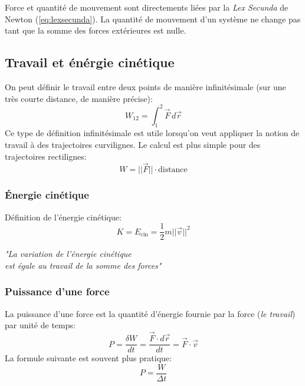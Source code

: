 \documentclass{article}
\numberwithin{equation}{section}
\begin{document}
Force et quantité de mouvement sont directements liées par la \emph{Lex Secunda} de Newton (\ref{eq:lexsecunda}). La quantité de mouvement d'un système ne change pas tant que la somme des forces extérieures est nulle.

\subsection{Travail et énérgie cinétique}

On peut définir le travail entre deux points de manière infinitésimale (sur une très courte distance, de manière précise):
\begin{equation}
	\boxed{ W_{12} = \int_1^2 \vec F \, d \vec r }
\end{equation}
Ce type de définition infinitésimale est utile lorsqu'on veut appliquer la notion de travail à des trajectoires curvilignes. Le calcul est plus simple pour des trajectoires rectilignes:
\begin{equation}
	\boxed{ W = ||\vec F|| \cdot \text{distance} }
\end{equation}

\subsubsection{Énergie cinétique}
Définition de l'énergie cinétique:
\begin{equation}
	\boxed{ K = E_\text{cin} = \frac{1}{2} m ||\vec v||^2 }
\end{equation}

\begin{center}
	\emph{"La variation de l'énergie cinétique \\ est égale au travail de la somme des forces"}
\end{center}


\subsubsection{Puissance d'une force}
La puissance d'une force est la quantité d'énergie fournie par la force (\emph{le travail}) par unité de temps:
\begin{equation}
	\boxed{ P = \frac{\delta W}{dt} = \frac{\vec F \cdot d \vec r}{dt} = \vec F \cdot \vec v }
\end{equation}
La formule suivante est souvent plus pratique:
\begin{equation}
	\boxed{ P = \dfrac{W}{\Delta t} }
\end{equation}
\end{document}
